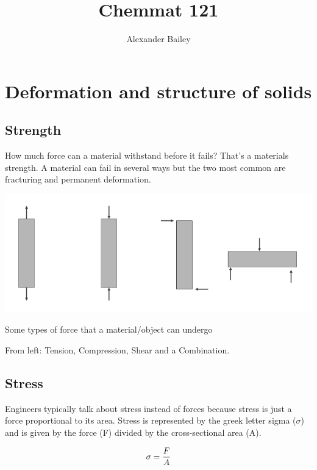 \documentclass[12pt]{article}
\begin{document}
\title{Chemmat 121}
\author{Alexander Bailey}
\maketitle
\flushbottom

\section{Deformation and structure of solids}
\subsection{Strength}
How much force can a material withstand before it fails?
That's a materials strength.
A material can fail in several ways but the two most common are fracturing and permanent deformation.

  \includegraphics[scale=0.5]{force-types}
  \begin{center}
    Some types of force that a material/object can undergo

    From left: Tension, Compression, Shear and a Combination.
  \end{center}

\subsection{Stress}
Engineers typically talk about stress instead of forces because stress is just a force proportional to its area.
Stress is represented by the greek letter sigma ($\sigma$) and is given by the force (F) divided by the cross-sectional area (A).


\begin{equation*}
  \sigma = \frac{F}{A} \\
\end{equation*}
\end{document}
